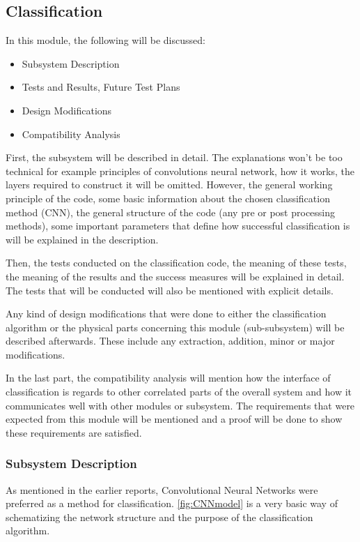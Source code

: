 \subsection{Classification}

In this module, the following will be discussed: 

\begin{itemize}
    \item Subsystem Description
    \item Tests and Results, Future Test Plans
    \item Design Modifications
    \item Compatibility Analysis
\end{itemize}

First, the subsystem will be described in detail. The explanations won't be too technical for example principles of convolutions neural network, how it works, the layers required to construct it will be omitted. However, the general working principle of the code, some basic information about the chosen classification method (CNN), the general structure of the code (any pre or post processing methods), some important parameters that define how successful classification is will be explained in the description.

Then, the tests conducted on the classification code, the meaning of these tests, the meaning of the results and the success measures will be explained in detail. The tests that will be conducted will also be mentioned with explicit details. 

Any kind of design modifications that were done to either the classification algorithm or the physical parts concerning this module (sub-subsystem) will be described afterwards. These include any extraction, addition, minor or major modifications.

In the last part, the compatibility analysis will mention how the interface of classification is regards to other correlated parts of the overall system and how it communicates well with other modules or subsystem. The requirements that were expected from this module will be mentioned and a proof will be done to show these requirements are satisfied. 

\subsubsection{Subsystem Description}

As mentioned in the earlier reports, Convolutional Neural Networks were preferred as a method for classification. \ref{fig:CNNmodel} is a very basic way of schematizing the network structure and the purpose of the classification algorithm. 
    
